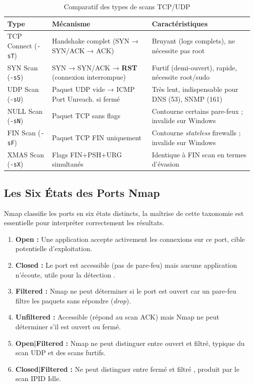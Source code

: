 \begin{table}[htbp]
\centering
\caption{Comparatif des types de scans TCP/UDP}
\label{tab:scan_types}
\begin{tabular}{p{3cm}p{4.5cm}p{5.5cm}}
\toprule
\textbf{Type} & \textbf{Mécanisme} & \textbf{Caractéristiques} \\
\midrule
TCP Connect (\texttt{-sT})
    & Handshake complet (SYN → SYN/ACK → ACK)
    & Bruyant (logs complets), ne nécessite pas root \\
\addlinespace
SYN Scan (\texttt{-sS})
    & SYN → SYN/ACK → \textbf{RST} (connexion interrompue)
    & Furtif (demi-ouvert), rapide, nécessite root/sudo \\
\addlinespace
UDP Scan (\texttt{-sU})
    & Paquet UDP vide → ICMP Port Unreach. si fermé
    & Très lent, indispensable pour DNS (53), SNMP (161) \\
\addlinespace
NULL Scan (\texttt{-sN})
    & Paquet TCP sans flags
    & Contourne certains pare-feux ; invalide sur Windows \\
\addlinespace
FIN Scan (\texttt{-sF})
    & Paquet TCP FIN uniquement
    & Contourne \textit{stateless} firewalls ; invalide sur Windows \\
\addlinespace
XMAS Scan (\texttt{-sX})
    & Flags FIN+PSH+URG simultanés
    & Identique à FIN scan en termes d'évasion \\
\bottomrule
\end{tabular}
\end{table}

\subsection{Les Six États des Ports Nmap}
\label{subsec:port_states}

Nmap classifie les ports en six états distincts, la maîtrise de cette
taxonomie est essentielle pour interpréter correctement les résultats.

\begin{enumerate}
    \item \textbf{Open :} Une application accepte activement les connexions
          sur ce port, cible potentielle d'exploitation.
    \item \textbf{Closed :} Le port est accessible (pas de pare-feu) mais
          aucune application n'écoute, utile pour la détection .
    \item \textbf{Filtered :} Nmap ne peut déterminer si le port est ouvert
          car un pare-feu filtre les paquets sans répondre (\textit{drop}).
    \item \textbf{Unfiltered :} Accessible (répond au scan ACK) mais Nmap
          ne peut déterminer s'il est ouvert ou fermé.
    \item \textbf{Open|Filtered :} Nmap ne peut distinguer entre ouvert et
          filtré, typique du scan UDP et des scans furtifs.
    \item \textbf{Closed|Filtered :} Ne peut distinguer entre fermé et filtré
         , produit par le scan IPID Idle.
\end{enumerate}

